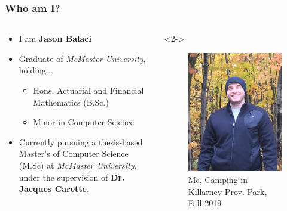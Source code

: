 \documentclass{beamer}
\begin{document}
\begin{frame}
    \frametitle{Who am I?}
    \begin{columns}[T,onlytextwidth]
        \begin{column}{.5\textwidth}
            \begin{minipage}{\textwidth}
                \begin{itemize}
                    \item<2-> I am \textbf{Jason Balaci}
                    \item<3-> Graduate of \emph{McMaster University}, holding...
                        \begin{itemize}
                            \item<4-> Hons. Actuarial and Financial Mathematics (B.Sc.)
                            \item<5-> Minor in Computer Science
                        \end{itemize}
                    \item<6-> Currently pursuing a thesis-based Master's of Computer Science (M.Sc) at \emph{McMaster University}, under the supervision of \textbf{Dr. Jacques Carette}.
                \end{itemize}
            \end{minipage}
        \end{column}
        \begin{column}{.45\textwidth}<2->
            \begin{figure}
                \includegraphics[width=.8\textwidth]{assets/me.jpeg}
                \caption{Me, Camping in Killarney Prov. Park, Fall 2019}
            \end{figure}
        \end{column}
    \end{columns}
\end{frame}
\end{document}
